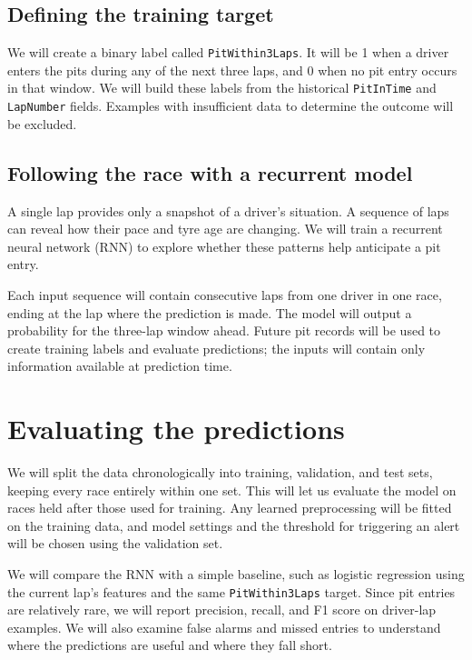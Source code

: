 \documentclass[11pt]{article}
\begin{document}
\subsection{Defining the training target}

We will create a binary label called \texttt{PitWithin3Laps}. It will be 1 when a driver enters the pits during any of the next three laps, and 0 when no pit entry occurs in that window. We will build these labels from the historical \texttt{PitInTime} and \texttt{LapNumber} fields. Examples with insufficient data to determine the outcome will be excluded.

\subsection{Following the race with a recurrent model}

A single lap provides only a snapshot of a driver's situation. A sequence of laps can reveal how their pace and tyre age are changing. We will train a recurrent neural network (RNN) to explore whether these patterns help anticipate a pit entry.

Each input sequence will contain consecutive laps from one driver in one race, ending at the lap where the prediction is made. The model will output a probability for the three-lap window ahead. Future pit records will be used to create training labels and evaluate predictions; the inputs will contain only information available at prediction time.

\section{Evaluating the predictions}

We will split the data chronologically into training, validation, and test sets, keeping every race entirely within one set. This will let us evaluate the model on races held after those used for training. Any learned preprocessing will be fitted on the training data, and model settings and the threshold for triggering an alert will be chosen using the validation set.

We will compare the RNN with a simple baseline, such as logistic regression using the current lap's features and the same \texttt{PitWithin3Laps} target. Since pit entries are relatively rare, we will report precision, recall, and F1 score on driver-lap examples. We will also examine false alarms and missed entries to understand where the predictions are useful and where they fall short.
\end{document}
